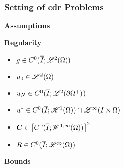 \begin{frame}
    \frametitle{Setting of \acrshort{cdr} Problems}

    \vspace*{\fill}
    \begin{center}
        {\color{\accentcolor} \Large \textbf{Assumptions}}
    \end{center}

    \begin{multicols}{2}

        \begin{center}
            {\color{\accentcolor} \Large \textbf{Regularity}}
            \vspace*{0.5cm}
            
            \begin{minipage}{0.4\textwidth}
                \begin{itemize}
                    \item $g \in C^0(\overline{I}; \mathscr{L}^{2}(\Omega))$
                    \item $u_0 \in \mathscr{L}^{2}(\Omega)$
                    \item $u_N \in C^0(\overline{I}; \mathscr{L}^{2}(\partial \Omega^+))$
                    \item { \color{\accentcolor} $u^* \in C^0(\overline{I}; \mathscr{H}^{1}(\Omega)) \cap \mathscr{L}^{\infty}(I \times \Omega)$}
                    \item $\bm{C} \in \left[ C^0(\overline{I}; \mathscr{W}^{1, \infty}(\Omega)) \right]^2$
                    \item $R \in C^0(\overline{I}; \mathscr{L}^{\infty}(\Omega))$
                \end{itemize}
            \end{minipage}
        \end{center}

        \vfill\null
        \columnbreak

        \begin{center}
            {\color{\accentcolor} \Large \textbf{Bounds}}
            \vspace*{0.5cm}
            

\end{center}
\end{multicols}
\end{frame}
